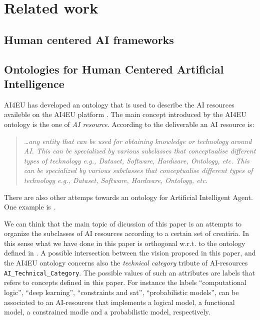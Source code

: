 \section{Related work}

\subsection{Human centered AI frameworks} 

\subsection{Ontologies for Human Centered Artificial Intelligence} 


AI4EU has developed an ontology that is used to describe the AI
resources availeble on the AI4EU platform \cite{ai4eu-D3.4}. 
The main concept introduced by the AI4EU ontology is the one of \emph{AI
  resource}. According to the deliverable an AI resource is:

\begin{quote}\it
\dots any entity that can be used for obtaining knowledge or
technology around AI. This can be specialized by various subclasses
that conceptualise different types of technology e.g., Dataset,
Software, Hardware, Ontology, etc. This can be specialized by various
subclasses that conceptualise different types of technology e.g.,
Dataset, Software, Hardware, Ontology, etc.
\end{quote}

There are also other attemps towards an ontology for Artificial
Intelligent Agent. One example is \cite{hawley2019challenges}. 

We can think that the main topic of dicussion of this paper is an
attempts to organize the subclasses of AI resources according to a
certain set of creatiria. In this sense what we have done in this
paper is orthogonal w.r.t. to the ontology defined in
\cite{ai4eu-D3}. A possible intersection between the vision
proposed in this paper, and the AI4EU ontology concerns also the
\emph{technical category}
tribute of AI-resources \texttt{AI\_Technical\_Category}. The possible
values of such an attributes are labels that refers to concepts
defined in this paper. For instance the labels ``computational logic'',
``deep learning'', ``constraints and sat'', ``probabilistic models'',
can be associated to an AI-resources that implements a logical model,
a functional model, a constrained modle and a probabilistic model,
respectively.


